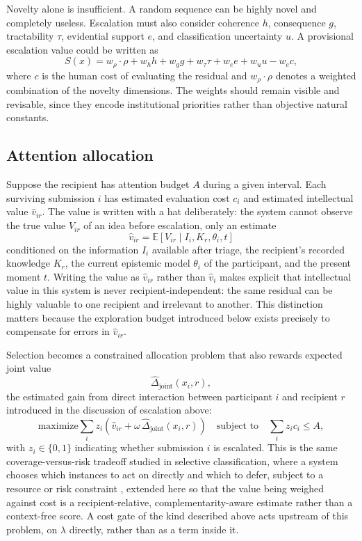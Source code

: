 \documentclass[11pt]{article}
\begin{document}
Novelty alone is insufficient. A random sequence can be highly novel and completely useless. Escalation must also consider coherence $h$, consequence $g$, tractability $\tau$, evidential support $e$, and classification uncertainty $u$. A provisional escalation value could be written as
\[
S(x) = w_\rho \cdot \rho + w_h h + w_g g + w_\tau \tau + w_e e + w_u u - w_c c,
\]
where $c$ is the human cost of evaluating the residual and $w_\rho \cdot \rho$ denotes a weighted combination of the novelty dimensions. The weights should remain visible and revisable, since they encode institutional priorities rather than objective natural constants.

\subsection{Attention allocation}

Suppose the recipient has attention budget $A$ during a given interval. Each surviving submission $i$ has estimated evaluation cost $c_i$ and estimated intellectual value $\widehat{v}_{ir}$. The value is written with a hat deliberately: the system cannot observe the true value $V_{ir}$ of an idea before escalation, only an estimate
\[
\widehat{v}_{ir} = \mathbb{E}\left[V_{ir} \mid I_i, K_r, \theta_i, t\right]
\]
conditioned on the information $I_i$ available after triage, the recipient's recorded knowledge $K_r$, the current epistemic model $\theta_i$ of the participant, and the present moment $t$. Writing the value as $\widehat{v}_{ir}$ rather than $\widehat{v}_i$ makes explicit that intellectual value in this system is never recipient-independent: the same residual can be highly valuable to one recipient and irrelevant to another. This distinction matters because the exploration budget introduced below exists precisely to compensate for errors in $\widehat{v}_{ir}$.

Selection becomes a constrained allocation problem that also rewards expected joint value
\[
\widehat{\Delta}_{\mathrm{joint}}(x_i,r),
\]
the estimated gain from direct interaction between participant $i$ and recipient $r$ introduced in the discussion of escalation above:
\[
\text{maximize} \sum_i z_i \left(\widehat{v}_{ir} + \omega\,\widehat{\Delta}_{\mathrm{joint}}(x_i,r)\right) \quad \text{subject to} \quad \sum_i z_i c_i \leq A,
\]
with $z_i \in \{0,1\}$ indicating whether submission $i$ is escalated. This is the same coverage-versus-risk tradeoff studied in selective classification, where a system chooses which instances to act on directly and which to defer, subject to a resource or risk constraint \cite{geifman2017}, extended here so that the value being weighed against cost is a recipient-relative, complementarity-aware estimate rather than a context-free score. A cost gate of the kind described above acts upstream of this problem, on $\lambda$ directly, rather than as a term inside it.
\end{document}
